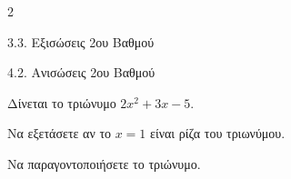 \begin{ylh}{2}
    \item 3.3. Εξισώσεις 2ου Βαθμού
    \item 4.2. Ανισώσεις 2ου Βαθμού
\end{ylh}
Δίνεται το τριώνυμο $2x^2+3x-5$.
\begin{alist}
\item Να εξετάσετε αν το $x = 1$ είναι ρίζα του τριωνύμου.
\item Να παραγοντοποιήσετε το τριώνυμο.
\end{alist}

